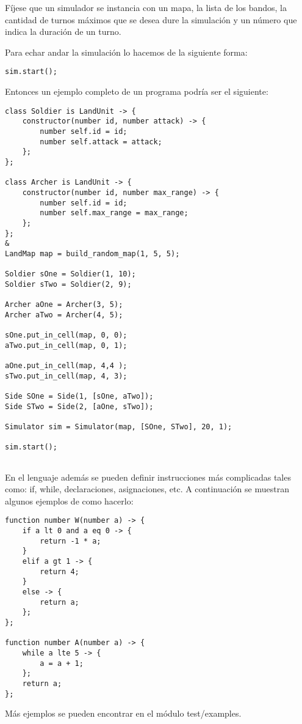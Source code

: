 F\'ijese que un simulador se instancia con un mapa, la lista de los bandos, la cantidad de turnos m\'aximos que se desea dure la simulaci\'on y un n\'umero que indica la duraci\'on de un turno.

Para echar andar la simulaci\'on lo hacemos de la siguiente forma: 

\begin{verbatim}
sim.start();
\end{verbatim}

Entonces un ejemplo completo de un programa podr\'ia ser el siguiente:

\begin{verbatim}
class Soldier is LandUnit -> {
    constructor(number id, number attack) -> {
        number self.id = id;
        number self.attack = attack;
    };
};

class Archer is LandUnit -> {
    constructor(number id, number max_range) -> {
        number self.id = id;
        number self.max_range = max_range;
    };
};
&
LandMap map = build_random_map(1, 5, 5);

Soldier sOne = Soldier(1, 10);
Soldier sTwo = Soldier(2, 9);

Archer aOne = Archer(3, 5);
Archer aTwo = Archer(4, 5);

sOne.put_in_cell(map, 0, 0);
aTwo.put_in_cell(map, 0, 1);

aOne.put_in_cell(map, 4,4 );
sTwo.put_in_cell(map, 4, 3);

Side SOne = Side(1, [sOne, aTwo]);
Side STwo = Side(2, [aOne, sTwo]);

Simulator sim = Simulator(map, [SOne, STwo], 20, 1);

sim.start();
	
\end{verbatim}

En el lenguaje adem\'as se pueden definir instrucciones m\'as complicadas tales como: if, while, declaraciones, asignaciones, etc. A continuaci\'on se muestran algunos ejemplos de como hacerlo:

\begin{verbatim}
function number W(number a) -> { 
    if a lt 0 and a eq 0 -> { 
        return -1 * a;  
    } 
    elif a gt 1 -> {
        return 4;
    } 
    else -> { 
        return a; 
    }; 
};

function number A(number a) -> { 
    while a lte 5 -> {
        a = a + 1;
    }; 
    return a;
};
\end{verbatim} 

M\'as ejemplos se pueden encontrar en el m\'odulo test/examples.
